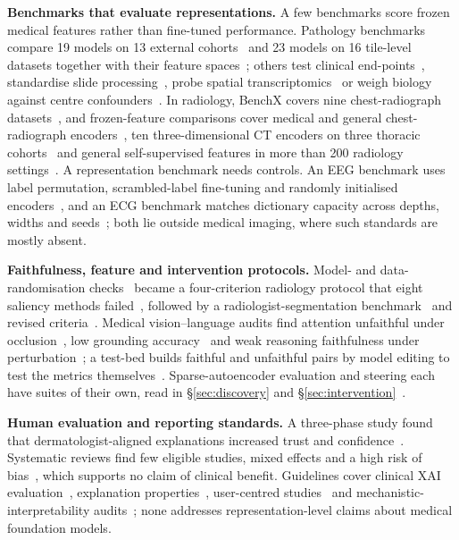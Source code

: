 \textbf{Benchmarks that evaluate representations.} A few benchmarks score frozen medical features rather
than fine-tuned performance. Pathology benchmarks compare 19 models on 13 external
cohorts~\cite{neidlinger2025benchmark} and 23 models on 16 tile-level datasets together with their feature
spaces~\cite{marza2025thunder}; others test clinical end-points~\cite{campanella2024clinical}, standardise
slide processing~\cite{zhang2025pathobench}, probe spatial transcriptomics~\cite{jaume2024hest} or weigh
biology against centre confounders~\cite{dejong2025current}. In radiology, BenchX covers nine
chest-radiograph datasets~\cite{zhou2024benchx}, and frozen-feature comparisons cover medical and general
chest-radiograph encoders~\cite{li2025featurequality}, ten three-dimensional CT encoders on three thoracic
cohorts~\cite{chevli2026frozenct} and general self-supervised features in more than 200 radiology
settings~\cite{baharoon2023dinov2}. A representation benchmark needs controls. An EEG benchmark uses
label permutation, scrambled-label fine-tuning and randomly initialised encoders~\cite{zare2026eeg}, and
an ECG benchmark matches dictionary capacity across depths, widths and
seeds~\cite{duan2026ecginterpbench}; both lie outside medical imaging, where such standards are mostly
absent.

\textbf{Faithfulness, feature and intervention protocols.} Model- and data-randomisation
checks~\cite{adebayo2018sanity} became a four-criterion radiology protocol that eight saliency methods
failed~\cite{arun2021trustworthiness}, followed by a radiologist-segmentation
benchmark~\cite{saporta2022benchmarking} and revised criteria~\cite{zhang2023revisiting}. Medical
vision--language audits find attention unfaithful under occlusion~\cite{sadanandan2026attention}, low
grounding accuracy~\cite{chen2026grounding} and weak reasoning faithfulness under
perturbation~\cite{moll2025faithfulness}; a test-bed builds faithful and unfaithful pairs by model
editing to test the metrics themselves~\cite{zaman2025causal}. Sparse-autoencoder evaluation and steering each have suites of their own, read in
\S\ref{sec:discovery} and
\S\ref{sec:intervention}~\cite{karvonen2025saebench,chanin2026are,chanin2026synthsaebench,paulo2025sparse,paulo2024automatically,im2025unifiedsteering,tan2024steeringreliability,venkatesh2026nonident,korznikov2025the}.

\textbf{Human evaluation and reporting standards.} A three-phase study found that dermatologist-aligned
explanations increased trust and confidence~\cite{chanda2023dermatologist}. Systematic reviews find few
eligible studies, mixed effects and a high risk of bias~\cite{rosenbacke2024how,uddin2026which,gambetti2025a},
which supports no claim of clinical benefit. Guidelines cover clinical XAI
evaluation~\cite{jin2022guidelines,chen2021humancentered}, explanation
properties~\cite{nauta2023interpreting}, user-centred studies~\cite{rong2022userstudies,donosoguzman2025a}
and mechanistic-interpretability audits~\cite{lan2026auditable}; none addresses representation-level
claims about medical foundation models.
